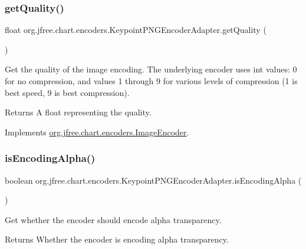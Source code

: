 \subsubsection{\texorpdfstring{get\+Quality()}{getQuality()}}
{\footnotesize\ttfamily float org.\+jfree.\+chart.\+encoders.\+Keypoint\+P\+N\+G\+Encoder\+Adapter.\+get\+Quality (\begin{DoxyParamCaption}{ }\end{DoxyParamCaption})}

Get the quality of the image encoding. The underlying encoder uses int values\+: 0 for no compression, and values 1 through 9 for various levels of compression (1 is best speed, 9 is best compression).

\begin{DoxyReturn}{Returns}
A float representing the quality. 
\end{DoxyReturn}


Implements \mbox{\hyperlink{interfaceorg_1_1jfree_1_1chart_1_1encoders_1_1_image_encoder_a292037d46187ca04bbd3a9362bf6ad22}{org.\+jfree.\+chart.\+encoders.\+Image\+Encoder}}.

\mbox{\label{classorg_1_1jfree_1_1chart_1_1encoders_1_1_keypoint_p_n_g_encoder_adapter_a73ca86c91d8420342f9993c0286e0408}} 
\subsubsection{\texorpdfstring{is\+Encoding\+Alpha()}{isEncodingAlpha()}}
{\footnotesize\ttfamily boolean org.\+jfree.\+chart.\+encoders.\+Keypoint\+P\+N\+G\+Encoder\+Adapter.\+is\+Encoding\+Alpha (\begin{DoxyParamCaption}{ }\end{DoxyParamCaption})}

Get whether the encoder should encode alpha transparency.

\begin{DoxyReturn}{Returns}
Whether the encoder is encoding alpha transparency. 
\end{DoxyReturn}


